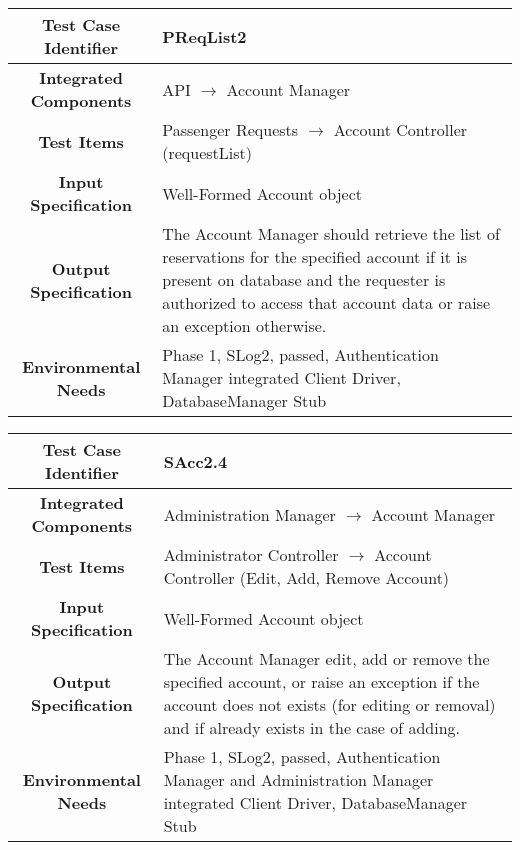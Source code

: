 \documentclass[11pt, a4paper,titlepage]{article}
\begin{document}
		 \begin{tabularx}{\textwidth}{| c|X|}
		 	\hline \textbf{Test Case Identifier} & PReqList2 \\
		 	\hline \textbf{Integrated Components} & API $\rightarrow $ Account Manager \\
		 	\hline \textbf{Test Items} &  Passenger Requests  $\rightarrow $ Account Controller (requestList)\\
		 	\hline \textbf{Input Specification} &  Well-Formed Account object\\
		 	\hline \textbf{Output Specification} & The Account Manager should retrieve the list of reservations for the specified account if it is present on database and the requester is authorized to access that account data or raise an exception otherwise.\\
		 	\hline \textbf{Environmental Needs} &  Phase 1, SLog2, passed, \newline Authentication Manager integrated \newline 
		 	Client Driver, DatabaseManager Stub\\
		 	\hline
		 \end{tabularx}
		 \newline
		
		 
 		 \begin{tabularx}{\textwidth}{| c|X|}
	 		 	\hline \textbf{Test Case Identifier} & SAcc2.4 \\
	 		 	\hline \textbf{Integrated Components} &  Administration Manager $\rightarrow $ Account Manager \\
	 		 	\hline \textbf{Test Items} &  Administrator Controller  $\rightarrow $ Account Controller (Edit, Add, Remove Account)\\
	 		 	\hline \textbf{Input Specification} &  Well-Formed Account object\\
	 		 	\hline \textbf{Output Specification} & The Account Manager edit, add or remove the specified account, or raise an exception if the account does not exists (for editing or removal) and if already exists in the case of adding.\\
	 		 	\hline \textbf{Environmental Needs} & Phase 1, SLog2, passed, \newline Authentication Manager and Administration Manager integrated \newline 
	 		 	Client Driver, DatabaseManager Stub\\
	 		 	\hline
 		 \end{tabularx}
 		 \newline
		 
\end{document}

